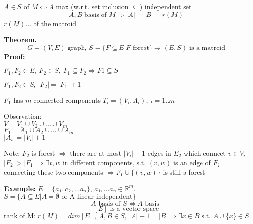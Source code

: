 \begin{definition}
	$A\in S$  of $M \Leftrightarrow A$ max (w.r.t. set inclusion $\subseteq$) independent set
	\[
	A, B \text{ basis of } M \Rightarrow |A| = |B| = r(M)
	\]
	$r(M)$...  of the matroid
\end{definition}

\textbf{Theorem.}
\[G=(V,E) \text{ graph, }S=\{F\subseteq E | F \text{ forest}\} \Rightarrow (E,S) \text{ is a matroid}\]
\textbf{Proof:}
\begin{compactenum}[(1)]
	\item{$F_1, F_2 \in E,~F_2\in S,~F_1\subseteq F_2\Rightarrow F1\subseteq S$}
	\item{$F_1, F_2\in S, ~|F_2| = |F_1| + 1$}
	\item{$F_1$} has $m$ connected components $T_i=(V_i, A_i),~i=1..m$
	\item{Observation: \\
	$V=V_1\cup V_2\cup ... \cup V_m$\\
	$F_1 = A_1\cup A_2\cup ... \cup A_m$\\
	$|A_i|=|V_i|+1$}
	\item{}
	\item{Note: $F_2$ is forest $\Rightarrow$ there are at most $|V_i|-1$ edges in $E_2$ which connect $v\in V_i$ $|F_2| > |F_1| \Rightarrow \exists v,w $ in different components, s.t. $(v,w)$ is an edge of $F_2$ connecting these two components $\Rightarrow F_1\cup\{(v,w)\}$ is still a forest}
\end{compactenum}


\textbf{Example:} $E=\{a_1, a_2, ... a_n\}$, $a_1, ... a_n \in \mathbb{R}^m$,
$S = \{A\subseteq E | A=\emptyset \text{ or A linear independent}\}$\\
\[A \text{ basis of } S \Leftrightarrow A \text{ basis }
\]
\[
	[E] \text{ is a vector space}
\]
\[
	\text{rank of M: } r(M) = dim[E],~A,B\in S,~|A|+1=|B|\Rightarrow \exists x\in B \text{ s.t. } A\cup \{x\}\in S
\]

